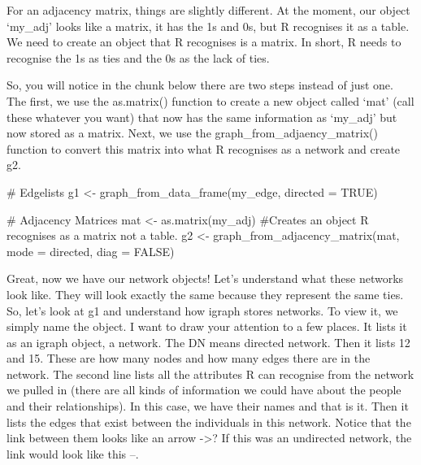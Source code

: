 \documentclass[
  letterpaper,
  DIV=11,
  numbers=noendperiod]{scrreprt}
\newenvironment{Shaded}{\begin{snugshade}}{\end{snugshade}}
\newcommand{\AttributeTok}[1]{\textcolor[rgb]{0.40,0.45,0.13}{#1}}
\newcommand{\CommentTok}[1]{\textcolor[rgb]{0.37,0.37,0.37}{#1}}
\newcommand{\ConstantTok}[1]{\textcolor[rgb]{0.56,0.35,0.01}{#1}}
\newcommand{\FunctionTok}[1]{\textcolor[rgb]{0.28,0.35,0.67}{#1}}
\newcommand{\NormalTok}[1]{\textcolor[rgb]{0.00,0.23,0.31}{#1}}
\newcommand{\OtherTok}[1]{\textcolor[rgb]{0.00,0.23,0.31}{#1}}
\newcommand{\StringTok}[1]{\textcolor[rgb]{0.13,0.47,0.30}{#1}}
\begin{document}
For an adjacency matrix, things are slightly different. At the moment,
our object `my\_adj' looks like a matrix, it has the 1s and 0s, but R
recognises it as a table. We need to create an object that R recognises
is a matrix. In short, R needs to recognise the 1s as ties and the 0s as
the lack of ties.

So, you will notice in the chunk below there are two steps instead of
just one. The first, we use the as.matrix() function to create a new
object called `mat' (call these whatever you want) that now has the same
information as `my\_adj' but now stored as a matrix. Next, we use the
graph\_from\_adjaency\_matrix() function to convert this matrix into
what R recognises as a network and create g2.

\begin{Shaded}
\begin{Highlighting}[]
\CommentTok{\# Edgelists}
\NormalTok{g1 }\OtherTok{\textless{}{-}} \FunctionTok{graph\_from\_data\_frame}\NormalTok{(my\_edge, }\AttributeTok{directed =} \ConstantTok{TRUE}\NormalTok{)}

\CommentTok{\# Adjacency Matrices}
\NormalTok{mat }\OtherTok{\textless{}{-}} \FunctionTok{as.matrix}\NormalTok{(my\_adj) }\CommentTok{\#Creates an object R recognises as a matrix not a table. }
\NormalTok{g2 }\OtherTok{\textless{}{-}} \FunctionTok{graph\_from\_adjacency\_matrix}\NormalTok{(mat, }\AttributeTok{mode =} \StringTok{\textquotesingle{}directed\textquotesingle{}}\NormalTok{, }\AttributeTok{diag =} \ConstantTok{FALSE}\NormalTok{)}
\end{Highlighting}
\end{Shaded}

Great, now we have our network objects! Let's understand what these
networks look like. They will look exactly the same because they
represent the same ties. So, let's look at g1 and understand how igraph
stores networks. To view it, we simply name the object. I want to draw
your attention to a few places. It lists it as an igraph object, a
network. The DN means directed network. Then it lists 12 and 15. These
are how many nodes and how many edges there are in the network. The
second line lists all the attributes R can recognise from the network we
pulled in (there are all kinds of information we could have about the
people and their relationships). In this case, we have their names and
that is it. Then it lists the edges that exist between the individuals
in this network. Notice that the link between them looks like an arrow
-\textgreater? If this was an undirected network, the link would look
like this --.
\end{document}
